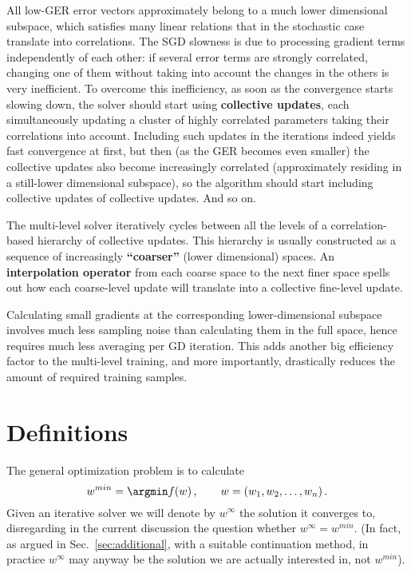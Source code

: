 \documentclass{article} %
\begin{document}
All low-GER error vectors approximately belong to a much lower dimensional subspace, which satisfies many linear relations that in the stochastic case translate into correlations. The SGD slowness is due to processing gradient terms independently of each other: if several error terms are strongly correlated, changing one of them without taking into account the changes in the others is very inefficient. To overcome this inefficiency, as soon as the convergence starts slowing down, the solver should start using \textbf{collective updates}, each simultaneously updating a cluster of highly correlated parameters taking their correlations into account. Including such updates in the iterations indeed yields fast convergence at first, but then (as the GER becomes even smaller) the collective updates also become increasingly correlated (approximately residing in a still-lower dimensional subspace), so the algorithm should start including collective updates of collective updates. And so on.
	
The multi-level solver iteratively cycles between all the levels of a correlation-based hierarchy of collective updates. This hierarchy is usually constructed as a sequence of increasingly \textbf{“coarser”} (lower dimensional) spaces. An \textbf{interpolation operator} from each coarse space to the next finer space spells out how each coarse-level update will translate into a collective fine-level update.

Calculating small gradients at the corresponding lower-dimensional subspace involves much less sampling noise than calculating them in the full space, hence requires much less averaging per GD iteration. This adds another big efficiency factor to the multi-level training, and more importantly, drastically reduces the amount of required training samples.


\section{Definitions}
\label{sec:definitions}
The general optimization problem is to calculate
$$
	w^{min} = \argmin f(w)\,,\qquad w = (w_1, w_2,\dots, w_n)\,.
$$
Given an iterative solver we will denote by $w^{\infty}$ the solution it converges to, disregarding in the current discussion the question whether $w^{\infty} = w^{min}$. (In fact, as argued in Sec.~\ref{sec:additional}, with a suitable continuation method, in practice $w^{\infty}$ may anyway be the solution we are actually interested in, not $w^{min}$).
\end{document}
